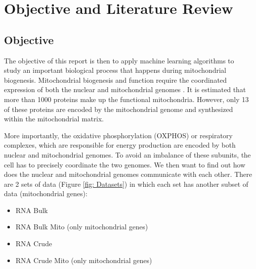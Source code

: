 
\chapter{Objective and Literature Review}

\setlength{\belowdisplayskip}{1pt} \setlength{\belowdisplayshortskip}{1pt}
\setlength{\abovedisplayskip}{1pt} \setlength{\abovedisplayshortskip}{1pt}

\section{Objective} \label{Objective}
The objective of this report is then to apply machine learning algorithms to study an important biological process that happens during mitochondrial biogenesis. Mitochondrial biogenesis and function require the coordinated expression of both the nuclear and mitochondrial genomes \cite{Couvillion2016}. It is estimated that more than 1000 proteins make up the functional mitochondria. However, only 13 of these proteins are encoded by the mitochondrial genome and synthesized within the mitochondrial matrix.

More importantly, the oxidative phosphorylation (OXPHOS) or respiratory complexes, which are responsible for energy production are encoded by both nuclear and mitochondrial genomes. To avoid an imbalance of these subunits, the cell has to precisely coordinate the two genomes. We then want to find out how does the nuclear and mitochondrial genomes communicate with each other. There are 2 sets of data (Figure \ref{fig: Datasets}) in which each set has another subset of data (mitochondrial genes):
\begin{itemize}
	\item RNA Bulk 
	\item RNA Bulk Mito (only mitochondrial genes)
	\item RNA Crude 
	\item RNA Crude Mito (only mitochondrial genes)
\end{itemize}

